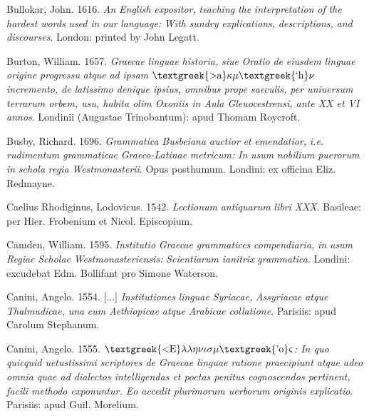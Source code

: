 \documentclass[output=paper]{langsci/langscibook}
\begin{document}
Bullokar, John. 1616. \textit{An} \textit{English} \textit{expositor,} \textit{teaching} \textit{the} \textit{interpretation} \textit{of} \textit{the} \textit{hardest} \textit{words} \textit{used} \textit{in} \textit{our} \textit{language:} \textit{With} \textit{sundry} \textit{explications,} \textit{descriptions,} \textit{and} \textit{discourses}. London: printed by John Legatt.

Burton, William. 1657. \textit{Graecae} \textit{linguae} \textit{historia,} \textit{siue} \textit{Oratio} \textit{de} \textit{eiusdem} \textit{linguae} \textit{origine} \textit{progressu} \textit{atque} \textit{ad} \textit{ipsam} \textit{$\text{\textgreek{>a}}\kappa \mu \text{\textgreek{`h}}\nu $ incremento, de latissimo denique ipsius, omnibus prope saeculis, per uniuersum terrarum orbem, usu, habita olim Oxoniis in Aula Gleuocestrensi, ante XX et VI annos}. Londinii (Augustae Trinobantum): apud Thomam Roycroft.

Busby, Richard. 1696. \textit{Grammatica} \textit{Busbeiana} \textit{auctior} \textit{et} \textit{emendatior,} \textit{i.e.} \textit{rudimentum} \textit{grammaticae} \textit{Graeco-Latinae} \textit{metricum:} \textit{In} \textit{usum} \textit{nobilium} \textit{puerorum} \textit{in} \textit{schola} \textit{regia} \textit{Westmonasterii}. Opus posthumum. Londini: ex officina Eliz. Redmayne.

Caelius Rhodiginus, Lodovicus. 1542. \textit{Lectionum} \textit{antiquarum} \textit{libri} \textit{XXX}. Basileae: per Hier. Frobenium et Nicol. Episcopium.

Camden, William. 1595. \textit{Institutio} \textit{Graecae} \textit{grammatices} \textit{compendiaria,} \textit{in} \textit{usum} \textit{Regiae} \textit{Scholae} \textit{Westmonasteriensis:} \textit{Scientiarum} \textit{ianitrix} \textit{grammatica}. Londini: excudebat Edm. Bollifant pro Simone Waterson.

Canini, Angelo. 1554. [...] \textit{Institutiones} \textit{linguae} \textit{Syriacae,} \textit{Assyriacae} \textit{atque} \textit{Thalmudicae,} \textit{una} \textit{cum} \textit{Aethiopicae} \textit{atque} \textit{Arabicae} \textit{collatione}. Parisiis: apud Carolum Stephanum.

Canini, Angelo. 1555. \textit{$\text{\textgreek{<E}}\lambda \lambda \eta \nu \iota \sigma \mu \text{\textgreek{'o}}\varsigma $: In quo quicquid uetustissimi scriptores de Graecae linguae ratione praecipiunt atque adeo omnia quae ad dialectos intelligendas et poetas penitus cognoscendos pertinent, facili methodo exponuntur. Eo accedit plurimorum uerborum originis explicatio}. Parisiis: apud Guil. Morelium.
\end{document}
